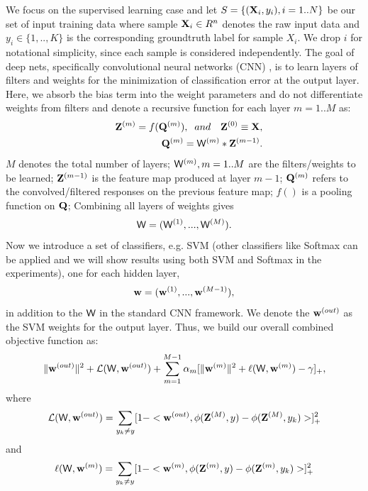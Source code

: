 \documentclass{article} %
\newcommand{\cX}{{\bf X}}
\newcommand{\cW}{{\bf \mathsf{W}}}
\newcommand{\cZ}{{\bf Z}}
\newcommand{\cQ}{{\bf Q}}
\newcommand{\sw}{{\bf w}}
\newcommand{\ow}{{\bf w}^{(out)}}
\newcommand{\cL}{\mathcal{L}}
\newcommand{\sL}{\ell}
\begin{document}
We focus on the supervised learning case and let $S=\{(\cX_i, y_i),i=1..N\}$ be our set of input training data where sample $\cX_i \in R^n$ denotes the raw input data and $y_i \in \{1,..,K\}$ is the corresponding groundtruth label for sample $X_i$. We drop $i$ for notational simplicity, since each sample is considered independently. The goal of deep nets, specifically convolutional neural networks (CNN) \cite{CNN}, is to learn layers of filters and weights for the minimization of classification error at the output layer. Here, we absorb the bias term into the weight parameters and do not differentiate weights from filters and denote a recursive function for each layer $m=1..M$ as:
\begin{eqnarray}
	& & \cZ^{(m)} = f(\cQ^{(m)}), \;\; 	and \quad \cZ^{(0)}\equiv \cX,\label{eq:Z} \\
  & & \cQ^{(m)} = \cW^{(m)} * \cZ^{(m-1)}. \label{eq:Q}
\end{eqnarray}
$M$ denotes the total number of layers; $\cW^{(m)}, m=1..M$ are the filters/weights to be learned; $\cZ^{(m-1)}$ is the feature map produced at layer $m-1$; $\cQ^{(m)}$ refers to the convolved/filtered responses on the previous feature map; $f()$ is a pooling function on $\cQ$; 
Combining all layers of weights gives
\[
   \cW = (\cW^{(1)},...,\cW^{(M)}).
\]
Now we introduce a set of classifiers, e.g. SVM (other classifiers like Softmax can be applied and we will show results using both SVM and Softmax in the experiments), one for each hidden layer,
\[
   \sw = (\sw^{(1)},...,\sw^{(M-1)}),
\]
in addition to the $\cW$ in the standard CNN framework.
We denote the $\ow$ as the SVM weights for the output layer. 
Thus, we build our overall combined objective function as:
\begin{equation}
{\lVert \ow \rVert^2 + \cL(\cW, \ow) + \sum_{m=1}^{M-1} \alpha_m  [\lVert \sw^{(m)} \rVert^2 + \sL(\cW, \sw^{(m)}) - \gamma]_+,}
\label{eq:total2}
\end{equation}
where
\begin{equation}
\label{eq:layer}
{\cL(\cW, \sw^{(out)})  = \sum_{y_k \ne y} [1- <\sw^{(out)},  \phi(\cZ^{(M)}, y) - \phi(\cZ^{(M)}, y_k)>]_{+}^2 }
\end{equation}
and
\begin{equation}
\label{eq:closs}
{\sL(\cW, \sw^{(m)})  = \sum_{y_k \ne y} [1- <\sw^{(m)}, \phi(\cZ^{(m)}, y) - \phi(\cZ^{(m)}, y_k)>]_{+}^2 }
\end{equation}
\end{document}
